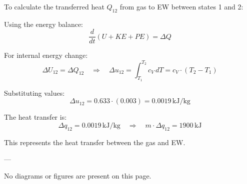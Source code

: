 To calculate the transferred heat \( Q_{12} \) from gas to EW between states 1 and 2:  

Using the energy balance:  
\[
\frac{d}{dt} \left( U + KE + PE \right) = \Delta Q
\]  

For internal energy change:  
\[
\Delta U_{12} = \Delta Q_{12} \quad \Rightarrow \quad \Delta u_{12} = \int_{T_1}^{T_2} c_V \, dT = c_V \cdot (T_2 - T_1)
\]  

Substituting values:  
\[
\Delta u_{12} = 0.633 \cdot (0.003) = 0.0019 \, \text{kJ/kg}
\]  

The heat transfer is:  
\[
\Delta q_{12} = 0.0019 \, \text{kJ/kg} \quad \Rightarrow \quad m \cdot \Delta q_{12} = 1900 \, \text{kJ}
\]  

This represents the heat transfer between the gas and EW.  

---

No diagrams or figures are present on this page.
